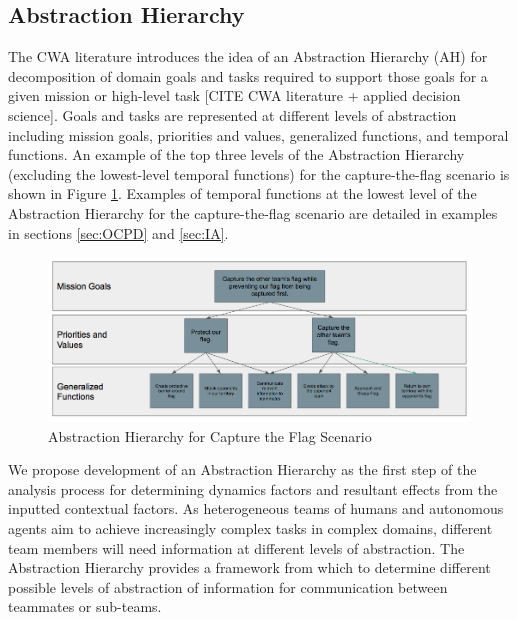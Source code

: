 \documentclass[letterpaper, 10 pt, conference]{ieeeconf}  %
\theoremstyle{definition}
\begin{document}
\subsection{Abstraction Hierarchy}
The CWA literature introduces the idea of an Abstraction Hierarchy (AH) for decomposition of domain goals and tasks required to support those goals for a given mission or high-level task [CITE CWA literature + applied decision science]. Goals and tasks are represented at different levels of abstraction including mission goals, priorities and values, generalized functions, and temporal functions. An example of the top three levels of the Abstraction Hierarchy (excluding the lowest-level temporal functions) for the capture-the-flag scenario is shown in Figure \ref{fig:ctfah}. Examples of temporal functions at the lowest level of the Abstraction Hierarchy for the capture-the-flag scenario are detailed in examples in sections \ref{sec:OCPD} and \ref{sec:IA}.

   
    \begin{figure}[tb]
    \centering
    \includegraphics[width=\textwidth]{ctfAH.png}
   \caption{Abstraction Hierarchy for Capture the Flag Scenario}
    \label{fig:ctfah}
    \end{figure}

We propose development of an Abstraction Hierarchy as the first step of the analysis process for determining dynamics factors and resultant effects from the inputted contextual factors. As heterogeneous teams of humans and autonomous agents aim to achieve increasingly complex tasks in complex domains, different team members will need information at different levels of abstraction. The Abstraction Hierarchy provides a framework from which to determine different possible levels of abstraction of information for communication between teammates or sub-teams. 

\end{document}
